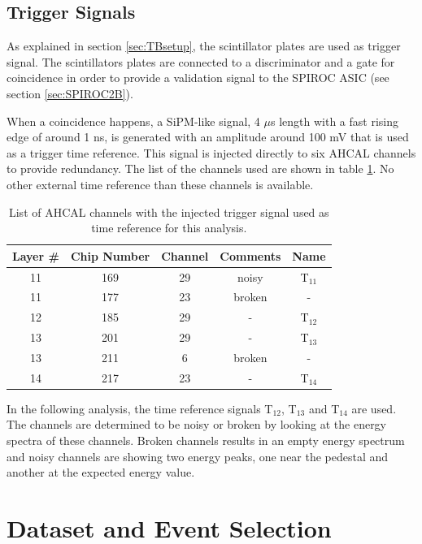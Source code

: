 \subsection{Trigger Signals}
\label{subsec:trigger}

As explained in section \ref{sec:TBsetup}, the scintillator plates are used as trigger signal. The scintillators plates are connected to a discriminator and a gate for coincidence in order to provide a validation signal to the SPIROC ASIC (see section \ref{sec:SPIROC2B}).

When a coincidence happens, a SiPM-like signal, 4 $\mu$s length with a fast rising edge of around 1 ns, is generated with an amplitude around 100 mV that is used as a trigger time reference. This signal is injected directly to six AHCAL channels to provide redundancy. The list of the channels used are shown in table \ref{table:trigger_signal_list}. No other external time reference than these channels is available.

\begin{table}[htb!]
	\centering
	\caption{List of AHCAL channels with the injected trigger signal used as time reference for this analysis.}
	\label{table:trigger_signal_list}
	\begin{tabular}{@{} ccccc @{}}
		\toprule
		Layer \# & Chip Number & Channel & Comments & Name \\
		\midrule
		11 & 169 & 29 & noisy & T$_{11}$ \\
		11 & 177 & 23 & broken & - \\
		12 & 185 & 29 & - & T$_{12}$ \\
		13 & 201 & 29 & -  & T$_{13}$ \\
		13 & 211 & 6 & broken & - \\
		14 & 217 & 23 & - & T$_{14}$ \\
		\bottomrule
	\end{tabular}
\end{table}

In the following analysis, the time reference signals T$_{12}$, T$_{13}$ and T$_{14}$ are used. The channels are determined to be noisy or broken by looking at the energy spectra of these channels. Broken channels results in an empty energy spectrum and noisy channels are showing two energy peaks, one near the pedestal and another at the expected energy value.

\section{Dataset and Event Selection}

